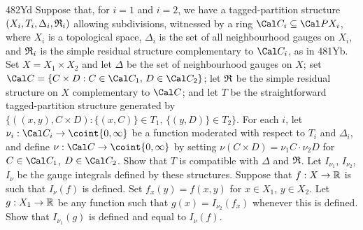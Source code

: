 {\spheader 482Yd Suppose that, for $i=1$ and $i=2$, we have a
tagged-partition structure $(X_i,T_i,\Delta_i,\frak R_i)$ allowing
subdivisions, witnessed by a ring $\Cal C_i\subseteq\Cal PX_i$, where
$X_i$ is a topological space, $\Delta_i$ is the set of all neighbourhood
gauges on $X_i$, and $\frak R_i$ is the simple residual structure
complementary to $\Cal C_i$, as in 481Yb.   Set
$X=X_1\times X_2$ and let $\Delta$ be the set of neighbourhood gauges
on $X$;  set $\Cal C=\{C\times D:C\in\Cal C_1,\,D\in\Cal C_2\}$;  let
$\frak R$ be the simple residual structure on $X$ complementary to
$\Cal C$;  and let $T$ be the straightforward tagged-partition
structure generated by
$\{((x,y),C\times D):\{(x,C)\}\in T_1,\,\{(y,D)\}\in T_2\}$.   For each
$i$, let $\nu_i:\Cal C_i\to\coint{0,\infty}$ be a function moderated
with respect to $T_i$ and $\Delta_i$, and define
$\nu:\Cal C\to\coint{0,\infty}$ by setting
$\nu(C\times D)=\nu_1C\cdot\nu_2D$ for $C\in\Cal C_1$, $D\in\Cal C_2$.
Show that $T$ is compatible with $\Delta$ and $\frak R$.   Let
$I_{\nu_1}$, $I_{\nu_2}$, $I_{\nu}$ be the gauge integrals defined by
these structures.   Suppose that $f:X\to\Bbb R$ is such that
$I_{\nu}(f)$ is defined.   Set $f_x(y)=f(x,y)$ for $x\in X_1$,
$y\in X_2$.   Let $g:X_1\to\Bbb R$ be any function such that
$g(x)=I_{\nu_2}(f_x)$ whenever this is defined.   Show that
$I_{\nu_1}(g)$ is defined and equal to $I_{\nu}(f)$.
}%

